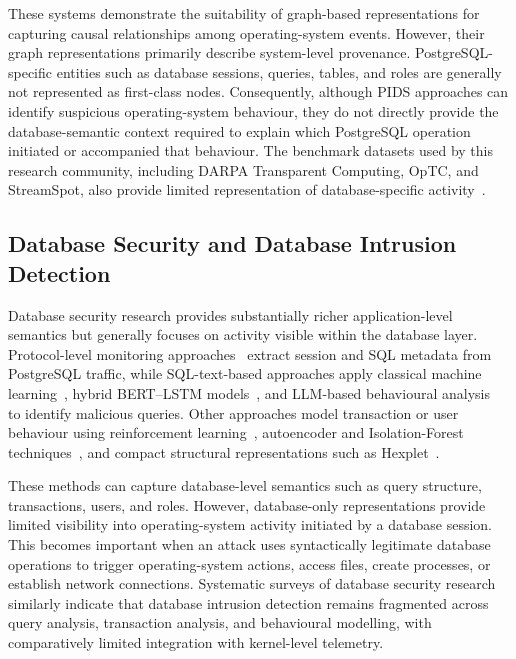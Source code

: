 \documentclass[conference]{IEEEtran}
\begin{document}
These systems demonstrate the suitability of graph-based representations for capturing causal relationships among operating-system events. However, their graph representations primarily describe system-level provenance. PostgreSQL-specific entities such as database sessions, queries, tables, and roles are generally not represented as first-class nodes. Consequently, although PIDS approaches can identify suspicious operating-system behaviour, they do not directly provide the database-semantic context required to explain which PostgreSQL operation initiated or accompanied that behaviour. The benchmark datasets used by this research community, including DARPA Transparent Computing, OpTC, and StreamSpot, also provide limited representation of database-specific activity~\cite{sok_provenance}.

\subsection{Database Security and Database Intrusion Detection}

Database security research provides substantially richer application-level semantics but generally focuses on activity visible within the database layer. Protocol-level monitoring approaches~\cite{febe} extract session and SQL metadata from PostgreSQL traffic, while SQL-text-based approaches apply classical machine learning~\cite{sqli_chisq}, hybrid BERT--LSTM models~\cite{sqli_bertlstm}, and LLM-based behavioural analysis~\cite{llm_dbids} to identify malicious queries. Other approaches model transaction or user behaviour using reinforcement learning~\cite{rl_txn}, autoencoder and Isolation-Forest techniques~\cite{insider_ae}, and compact structural representations such as Hexplet~\cite{hexplet}.

These methods can capture database-level semantics such as query structure, transactions, users, and roles. However, database-only representations provide limited visibility into operating-system activity initiated by a database session. This becomes important when an attack uses syntactically legitimate database operations to trigger operating-system actions, access files, create processes, or establish network connections. Systematic surveys of database security research~\cite{dbsec_survey1,dbsec_survey2} similarly indicate that database intrusion detection remains fragmented across query analysis, transaction analysis, and behavioural modelling, with comparatively limited integration with kernel-level telemetry.
\end{document}
